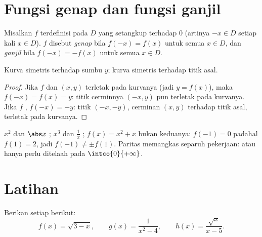\section{Fungsi genap dan fungsi ganjil}

\begin{definition}[Paritas]\label{def:g11:func:parity}
Misalkan $f$ terdefinisi pada  $D$ yang setangkup terhadap $0$
(artinya $-x \in D$ setiap kali $x \in D$).  $f$ disebut
\emph{genap} bila $f(-x) = f(x)$ untuk semua $x \in D$,
dan \emph{ganjil} bila $f(-x) = -f(x)$ untuk semua $x \in D$.
\end{definition}

\begin{proposition}\label{prop:g11:func:paritysym}
Kurva  simetris terhadap sumbu $y$; kurva
 simetris terhadap titik asal.
\end{proposition}

\begin{proof}
Jika $f$  dan $(x, y)$ terletak pada kurvanya (jadi $y = f(x)$), maka
$f(-x) = f(x) = y$: titik cerminnya $(-x, y)$ pun terletak pada kurvanya. Jika
$f$ , $f(-x) = -y$: titik $(-x, -y)$, cerminan $(x,y)$ terhadap
titik asal, terletak pada kurvanya.
\end{proof}

\begin{example}
$x^2$ dan $\abs x$ ; $x^3$ dan $\frac1x$ ;
$f(x) = x^2 + x$ bukan keduanya: $f(-1) = 0$ padahal $f(1) = 2$, jadi
$f(-1) \neq \pm f(1)$. Paritas memangkas separuh pekerjaan:  atau
 hanya perlu ditelaah pada $\intco{0}{+\infty}$.
\end{example}

\section{Latihan}

\begin{exercise}[$\star$]\label{exo:g11:func:1}
Berikan  setiap  berikut:
\[
f(x) = \sqrt{3 - x}, \qquad
g(x) = \frac{1}{x^2 - 4}, \qquad
h(x) = \frac{\sqrt{x}}{x - 5} .
\]
\end{exercise}

